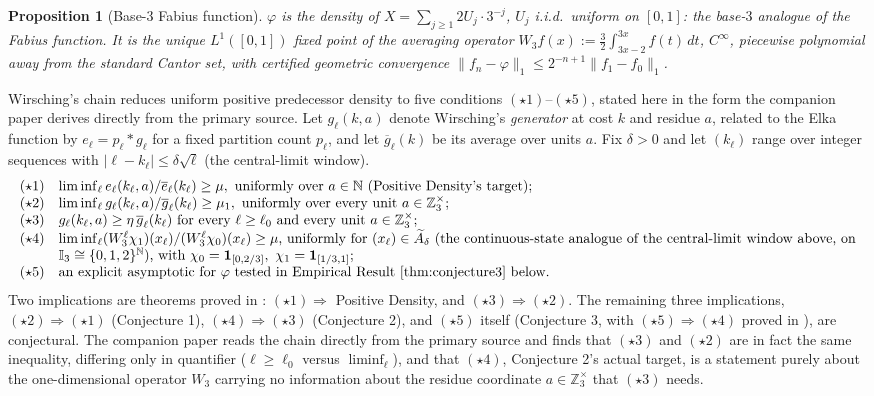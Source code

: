 \documentclass[11pt]{article}
\newtheorem{proposition}[theorem]{Proposition}
\theoremstyle{definition}
\theoremstyle{remark}
\begin{document}
\begin{proposition}[Base-$3$ Fabius function]\label{prop:fabius}
$\varphi$ is the density of $X = \sum_{j\ge 1} 2U_j\cdot 3^{-j}$, $U_j$
i.i.d.\ uniform on $[0,1]$: the base-$3$ analogue of the Fabius
function. It is the unique $L^1([0,1])$ fixed point of the averaging
operator $W_3 f(x) := \tfrac{3}{2} \int_{3x-2}^{3x} f(t)\,dt$,
$C^\infty$, piecewise polynomial away from the standard Cantor set,
with certified geometric convergence
$\|f_n-\varphi\|_1\le 2^{-n+1}\|f_1-f_0\|_1$.
\end{proposition}

Wirsching's chain reduces uniform positive predecessor density to five
conditions $(\star1)$--$(\star5)$, stated here in the form the
companion paper derives directly from the primary source. Let
$g_\ell(k,a)$ denote Wirsching's \emph{generator} at cost $k$ and
residue $a$, related to the Elka function by $e_\ell=p_\ell*g_\ell$ for
a fixed partition count $p_\ell$, and let $\overline g_\ell(k)$ be its
average over units $a$. Fix $\delta>0$ and let $(k_\ell)$ range over
integer sequences with $|\ell-k_\ell|\le\delta\sqrt\ell$ (the
central-limit window).
\[
\begin{array}{ll}
(\star1) & \liminf_\ell e_\ell(k_\ell,a)/\overline e_\ell(k_\ell)\ge\mu,
  \text{ uniformly over }a\in\mathbb N\text{ (Positive Density's target);}\\
(\star2) & \liminf_\ell g_\ell(k_\ell,a)/\overline g_\ell(k_\ell)\ge\mu_1,
  \text{ uniformly over every unit }a\in\mathbb Z_3^\times;\\
(\star3) & g_\ell(k_\ell,a)\ge\eta\,\overline g_\ell(k_\ell)\text{ for
  every }\ell\ge\ell_0\text{ and every unit }a\in\mathbb Z_3^\times;\\
(\star4) & \liminf_\ell(W_3^\ell\chi_1)(x_\ell)/(W_3^\ell\chi_0)(x_\ell)
  \ge\mu\text{, uniformly for }(x_\ell)\in\widetilde A_\delta\text{ (the
  continuous-state analogue of the central-limit window above, on}\\
 & \mathbb I_3\cong\{0,1,2\}^{\mathbb N}\text{), with
  }\chi_0=\mathbf1_{[0,2/3]},\ \chi_1=\mathbf1_{[1/3,1]};\\
(\star5) & \text{an explicit asymptotic for }\varphi\text{ tested in
  Empirical Result~\ref{thm:conjecture3} below.}
\end{array}
\]
Two implications are theorems proved in \cite{Wirsching2003}:
$(\star1)\Rightarrow$ Positive Density, and
$(\star3)\Rightarrow(\star2)$. The remaining three implications,
$(\star2)\Rightarrow(\star1)$ (Conjecture 1),
$(\star4)\Rightarrow(\star3)$ (Conjecture 2), and $(\star5)$ itself
(Conjecture 3, with $(\star5)\Rightarrow(\star4)$ proved in
\cite{Wirsching2003}), are conjectural. The companion paper reads the
chain directly from the primary source and finds that $(\star3)$ and
$(\star2)$ are in fact the same inequality, differing only in
quantifier ($\ell\ge\ell_0$ versus $\liminf_\ell$), and that
$(\star4)$, Conjecture 2's actual target, is a statement purely about
the one-dimensional operator $W_3$ carrying no information about the
residue coordinate $a\in\mathbb Z_3^\times$ that $(\star3)$ needs.
\end{document}
